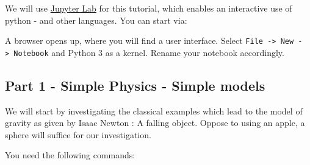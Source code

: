We will use \href{https://github.com/jupyterlab/jupyterlab}{Jupyter Lab}
for this tutorial, which enables an interactive use of python - and
other languages. You can start via:

\begin{Shaded}
\begin{Highlighting}[]



\end{Highlighting}
\end{Shaded}

A browser opens up, where you will find a user interface. Select
\texttt{File\ -\textgreater{}\ New\ -\textgreater{}\ Notebook} and
Python 3 as a kernel. Rename your notebook accordingly.

\hypertarget{part-1---simple-physics---simple-models}{%
\subsection{Part 1 - Simple Physics - Simple
models}\label{part-1---simple-physics---simple-models}}

We will start by investigating the classical examples which lead to the
model of gravity as given by Isaac Newton : A falling object. Oppose to
using an apple, a sphere will suffice for our investigation.

You need the following commands:

\begin{Shaded}
\begin{Highlighting}[]

\NormalTok{(}\OperatorTok{*}


\OperatorTok{*}

\OperatorTok{*}

\OperatorTok{*}
\OperatorTok{*}
\end{Highlighting}
\end{Shaded}

